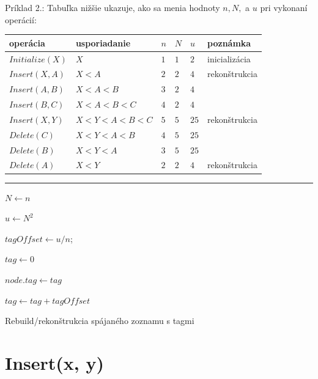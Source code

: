 \documentclass[
  digital,     %
  oneside,     %
  nosansbold,  %
  nocolorbold, %
  lof,         %
  lot,         %
]{fithesis4}
\begin{document}
Príklad 2.:
Tabuľka nižšie ukazuje, ako sa menia hodnoty $n, N,$ a $u$ pri vykonaní operácií:
\begin{table}
\begin{tabularx}{\textwidth}{| l | l | l | l | l | l}
    operácia & usporiadanie & $n$ & $N$ & $u$ & poznámka \\
    \midrule
    $Initialize(X)$ & $X$ & $1$ & $1$ & $2$ & inicializácia\\
    $Insert(X, A)$ & $X < A$ & $2$ & $2$ & $4$ & rekonštrukcia\\
    $Insert(A, B)$ & $X < A < B$ & $3$ & $2$ & $4$ & \\
    $Insert(B, C)$ & $X < A < B < C$ & $4$ & $2$ & $4$ & \\
    $Insert(X, Y)$ & $X < Y < A < B < C$ & $5$ & $5$ & $25$ & rekonštrukcia\\
    $Delete(C)$ & $X < Y < A < B$ & $4$ & $5$ & $25$ & \\
    $Delete(B)$ & $X < Y < A $ & $3$ & $5$ & $25$ & \\
    $Delete(A)$ & $X < Y$ & $2$ & $2$ & $4$ & rekonštrukcia\\
  \end{tabularx}
\end{table}

\begin{algorithm}
\hrule\vspace{0.2em}
$N \leftarrow n$\;

$u \leftarrow N^2$\;

$tagOffset \leftarrow u / n$; 

$tag \leftarrow 0$\;

{
    $node.tag \leftarrow tag$\;
    
    $tag \leftarrow tag + tagOffset$\;
}

\caption{Rebuild/rekonštrukcia spájaného zoznamu s tagmi}
\end{algorithm}

\section{Insert(x, y)}
\end{document}
